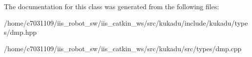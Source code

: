 The documentation for this class was generated from the following files\-:\begin{DoxyCompactItemize}
\item 
/home/c7031109/iis\-\_\-robot\-\_\-sw/iis\-\_\-catkin\-\_\-ws/src/kukadu/include/kukadu/types/dmp.\-hpp\item 
/home/c7031109/iis\-\_\-robot\-\_\-sw/iis\-\_\-catkin\-\_\-ws/src/kukadu/src/types/dmp.\-cpp\end{DoxyCompactItemize}
